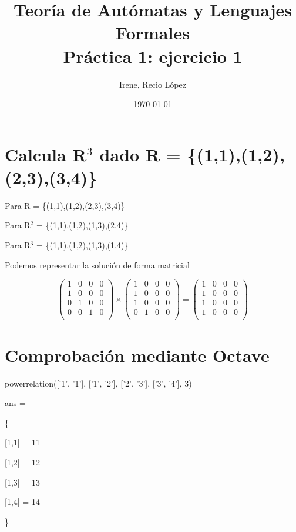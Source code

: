 \documentclass[fleqn, 10pt]{article}
\title{Teoría de Autómatas y Lenguajes Formales\\[.4\baselineskip]Práctica 1: ejercicio 1 }
\author{Irene, Recio López}
\date{\today}
\theoremstyle{plain}
\theoremstyle{definition}
\begin{document}
\maketitle

\section*{Calcula R$^3$ dado R = \{(1,1),(1,2),(2,3),(3,4)\}} 

Para R = \{(1,1),(1,2),(2,3),(3,4)\}

Para R$^2$ = \{(1,1),(1,2),(1,3),(2,4)\}

Para R$^3$ = \{(1,1),(1,2),(1,3),(1,4)\}

Podemos representar la solución de forma matricial

\begin{equation}
\begin{pmatrix}
1 & 0 & 0 & 0\\
1 & 0 & 0 & 0\\
0 & 1 & 0 & 0\\
0 & 0 & 1 & 0\\
\end{pmatrix}
\times
\begin{pmatrix}
1 & 0 & 0 & 0\\
1 & 0 & 0 & 0\\
1 & 0 & 0 & 0\\
0 & 1 & 0 & 0\\
\end{pmatrix}
=
\begin{pmatrix}
1 & 0 & 0 & 0\\
1 & 0 & 0 & 0\\
1 & 0 & 0 & 0\\
1 & 0 & 0 & 0\\
\end{pmatrix}
\end{equation} 
\section*{Comprobación mediante Octave} 
powerrelation({['1', '1'], ['1', '2'], ['2', '3'], ['3', '4']}, 3)

ans =

\{

  [1,1] = 11
  
  [1,2] = 12
  
  [1,3] = 13
  
  [1,4] = 14
  
\}
\end{document}
